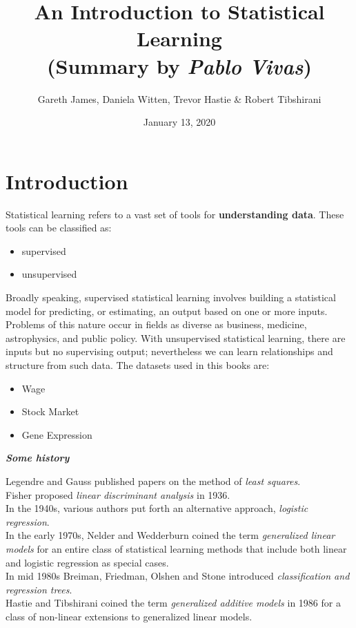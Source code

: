 \documentclass[12pt,a4paper]{article}
\author{Gareth James, Daniela Witten, Trevor Hastie \& Robert Tibshirani}
\title{An Introduction to Statistical Learning\\
\large{(Summary by \textit{Pablo Vivas})}}
\date{January 13, 2020}
\begin{document}
\maketitle
\section{Introduction}
Statistical learning refers to a vast set of tools for \textbf{understanding data}. These tools can be classified as:
\begin{itemize}
\item supervised 
\item unsupervised
\end{itemize}
Broadly speaking, supervised statistical learning involves building a statistical model for predicting, or estimating, an output based on one or more inputs. Problems of this nature occur in fields as diverse as business, medicine, astrophysics, and public policy. With unsupervised statistical learning, there are inputs but no supervising output; nevertheless we can learn relationships and structure from such data.
The datasets used in this books are:
\begin{itemize}
\item Wage 
\item Stock Market
\item Gene Expression
\end{itemize}

\textbf{\textit{Some history}}
\begin{framed}
Legendre and Gauss published papers on the method of \textit{least squares}.\\
Fisher proposed \textit{linear discriminant analysis} in 1936.\\
In the 1940s, various authors put forth an alternative approach, \textit{logistic regression}.\\
In the early 1970s, Nelder and Wedderburn coined the term \textit{generalized linear models} for an entire class of statistical learning methods that include both linear and logistic regression as special cases.\\ 
In mid 1980s Breiman, Friedman, Olshen and Stone introduced \textit{classiﬁcation and regression trees}.\\
Hastie and Tibshirani coined the term \textit{generalized additive models} in 1986 for a class of non-linear extensions to generalized linear models. 
\end{framed}
\end{document}
